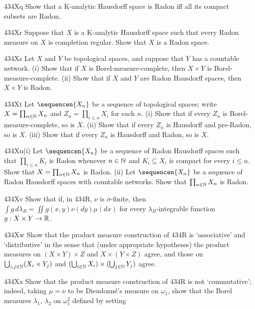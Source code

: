 {\sqheader 434Xq Show that a K-analytic Hausdorff space is Radon iff all
its compact subsets are Radon.   

\spheader 434Xr Suppose that $X$ is a K-analytic Hausdorff space such
that every Radon measure on $X$ is completion regular.   Show that $X$
is a Radon space.

\spheader 434Xs Let $X$ and $Y$ be topological spaces, and suppose that
$Y$ has a countable network.   (i) Show that if $X$ is
Borel-measure-complete, then $X\times Y$ is Borel-measure-complete.
(ii) Show that if $X$ and $Y$ are Radon Hausdorff spaces, then
$X\times Y$ is Radon.

\spheader 434Xt Let $\sequencen{X_n}$ be a sequence of topological
spaces;  write $X=\prod_{n\in\Bbb N}X_n$ and $Z_n=\prod_{i\le n}X_i$ for
each $n$.   (i) Show that if every $Z_n$ is Borel-measure-complete, so
is $X$.  (ii) Show that if every $Z_n$ is Hausdorff and pre-Radon, so is
$X$.   (iii) Show that if every $Z_n$ is Hausdorff and Radon, so is $X$.

\spheader 434Xu(i) Let $\sequencen{X_n}$ be a sequence of Radon
Hausdorff
spaces such that $\prod_{i\le n}K_i$ is Radon whenever $n\in\Bbb N$ and
$K_i\subseteq X_i$ is compact for every $i\le n$.   Show that
$X=\prod_{n\in\Bbb N}X_n$ is Radon.
(ii) Let $\sequencen{X_n}$ be a sequence of Radon Hausdorff
spaces with countable networks.   Show that $\prod_{n\in\Bbb N}X_n$ is
Radon.

\spheader 434Xv Show that if, in 434R, $\nu$ is $\sigma$-finite, then
$\int g\,d\lambda_B=\iint g(x,y)\nu(dy)\mu(dx)$ for every
$\lambda_B$-integrable function $g:X\times Y\to\Bbb R$.

\spheader 434Xw Show that the product measure construction of 434R is
`associative' and `distributive' in the sense that (under appropriate
hypotheses) the product measures on $(X\times Y)\times Z$ and
$X\times(Y\times Z)$ agree, and those on
$\bigcup_{i,j\in\Bbb N}(X_i\times Y_j)$ and
$(\bigcup_{i\in\Bbb N}X_i)\times(\bigcup_{j\in\Bbb N}Y_j)$ agree.

\sqheader 434Xx Show that the product measure construction of 434R is
not `commutative';  indeed, taking $\mu=\nu$ to be Dieudonn\'e's measure
on $\omega_1$, show that the Borel measures $\lambda_1$, $\lambda_2$ on
$\omega_1^2$ defined by setting


}
